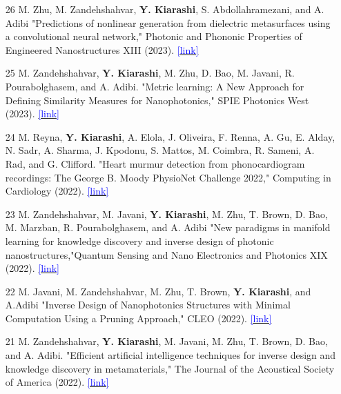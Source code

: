\documentclass[margin, line]{res}
\newenvironment{list1}{
  \begin{list}{\ding{113}}{%
      \setlength{\itemsep}{0in}
      \setlength{\parsep}{0in} \setlength{\parskip}{0in}
      \setlength{\topsep}{0in} \setlength{\partopsep}{0in} 
      \setlength{\leftmargin}{0.17in}}}{\end{list}}
\begin{document}
\begin{resume}
\begin{list1}
\begin{itemize}
\item[26]M. Zhu, M. Zandehshahvar, \textbf{Y. Kiarashi}, S. Abdollahramezani, and A. Adibi "Predictions of nonlinear generation from dielectric metasurfaces using a convolutional neural network," Photonic and Phononic Properties of Engineered Nanostructures XIII (2023). \href{https://www.spiedigitallibrary.org/conference-proceedings-of-spie/PC12431/PC1243119/Predictions-of-nonlinear-generation-from-dielectric-metasurfaces-using-a-convolutional/10.1117/12.2661614.short}{\textcolor{blue}{[link]}}

\item [25] M. Zandehshahvar, \textbf{Y. Kiarashi}, M. Zhu, D. Bao, M. Javani, R. Pourabolghasem, and A. Adibi. "Metric learning: A New Approach for Defining Similarity Measures for Nanophotonics," SPIE Photonics West (2023). \href{https://www.spiedigitallibrary.org/conference-proceedings-of-spie/PC12431/PC124310P/Metric-learning--a-new-approach-for-defining-similarity-measures/10.1117/12.2661572.short}{\textcolor{blue}{[link]}}

\item [24]  M. Reyna, \textbf{Y. Kiarashi}, A. Elola, J. Oliveira, F. Renna, A. Gu, E. Alday, N. Sadr, A. Sharma, J. Kpodonu, S. Mattos, M. Coimbra, R. Sameni, A. Rad, and G. Clifford. "Heart murmur detection from phonocardiogram recordings: The George B. Moody PhysioNet Challenge 2022," Computing in Cardiology (2022). \href{https://ieeexplore.ieee.org/abstract/document/10081821}{\textcolor{blue}{[link]}}

\item[23] M. Zandehshahvar, M. Javani, \textbf{Y. Kiarashi}, M. Zhu, T. Brown, D. Bao, M. Marzban, R. Pourabolghasem, and A. Adibi "New paradigms in manifold learning for knowledge discovery and inverse design of photonic nanostructures,"Quantum Sensing and Nano Electronics and Photonics XIX (2022). \href{https://www.spiedigitallibrary.org/conference-proceedings-of-spie/12430/1243009/New-paradigms-in-manifold-learning-for-knowledge-discovery-and-inverse/10.1117/12.2662754.short}{\textcolor{blue}{[link]}}

\item[22] M. Javani, M. Zandehshahvar, M. Zhu, T. Brown, \textbf{Y. Kiarashi}, and A.Adibi "Inverse Design of Nanophotonics Structures with Minimal Computation Using a Pruning Approach," CLEO (2022). \href{https://opg.optica.org/abstract.cfm?uri=cleo_qels-2022-JW3B.132}{\textcolor{blue}{[link]}}

\item[21] M. Zandehshahvar, \textbf{Y. Kiarashi}, M. Javani, M. Zhu, T. Brown, D. Bao, and A. Adibi. "Efficient artificial intelligence techniques for inverse design and knowledge discovery in metamaterials," The Journal of the Acoustical Society of America (2022). \href{https://pubs.aip.org/asa/jasa/article/151/4_Supplement/A254/2838818/Efficient-artificial-intelligence-techniques-for}{\textcolor{blue}{[link]}}


\end{itemize}
\end{list1}
\end{resume}
\end{document}
